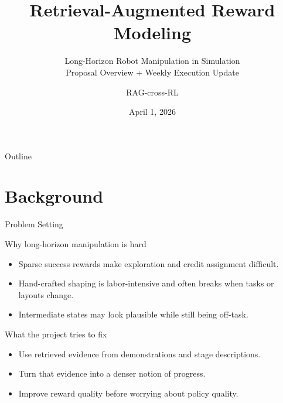 \documentclass[aspectratio=169,11pt]{beamer}
\title[Retrieval-Augmented Reward Modeling]{Retrieval-Augmented Reward Modeling}
\subtitle[Proposal + Weekly Update]{Long-Horizon Robot Manipulation in Simulation\\Proposal Overview + Weekly Execution Update}
\author[RAG-cross-RL]{RAG-cross-RL}
\date[Apr 1, 2026]{April 1, 2026}
\begin{document}
\begin{frame}[plain]
  \titlepage
\end{frame}

\begin{frame}{Outline}
  \tableofcontents
\end{frame}

\section{Background}
\begin{frame}[t]{Problem Setting}
\small
\begin{block}{Why long-horizon manipulation is hard}
  \begin{itemize}
    \item Sparse success rewards make exploration and credit assignment difficult.
    \item Hand-crafted shaping is labor-intensive and often breaks when tasks or layouts change.
    \item Intermediate states may look plausible while still being off-task.
  \end{itemize}
\end{block}

\begin{block}{What the project tries to fix}
  \begin{itemize}
    \item Use retrieved evidence from demonstrations and stage descriptions.
    \item Turn that evidence into a denser notion of progress.
    \item Improve reward quality before worrying about policy quality.
  \end{itemize}
\end{block}
\end{frame}
\end{document}
